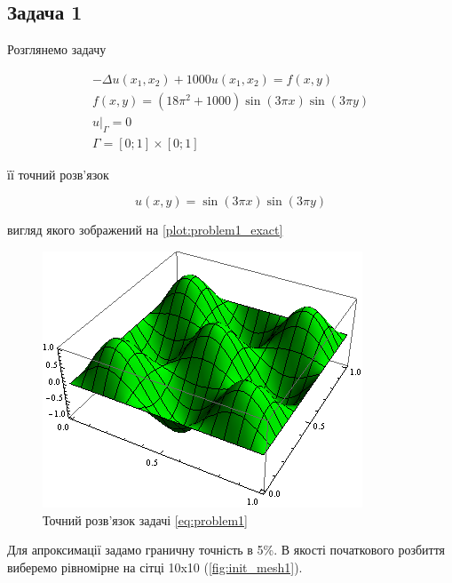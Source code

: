 
\subsection{Задача 1}

Розглянемо задачу

\begin{equation}\label{eq:problem1}
\begin{split}
	- \Delta u(x_1,x_2) + 1000u(x_1, x_2) = f(x,y) \\
	f(x,y) = (18 \pi^2 +1000)\sin(3 \pi x) \sin (3 \pi y) \\
	u|_\Gamma = 0 \\
	\Gamma = \left[0;1\right] \times \left[0;1\right]
\end{split}
\end{equation}

її точний розв'язок

\begin{equation}
	u(x,y) = \sin(3 \pi x) \sin (3 \pi y)
\end{equation}

вигляд якого зображений на \autoref{plot:problem1_exact}

\begin{figure}[H]
	\centering
    \includegraphics[scale=1.0]{problem1/ExactSolution}
    \caption{Точний розв'язок задачі \eqref{eq:problem1}}
    \label{plot:problem1_exact}
\end{figure}

Для апроксимації задамо граничну точність в 5\%.
В якості початкового розбиття виберемо рівномірне на сітці 10x10 (\autoref{fig:init_mesh1}).

